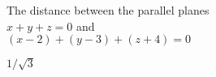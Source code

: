 {The distance between the parallel planes\\
$x+y+z=0$ and \\
$(x-2)+(y-3)+(z+4)=0$

}
{$1/\sqrt{3}$
}

